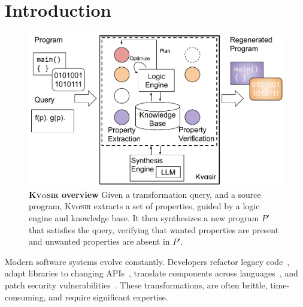 \documentclass[nonacm,sigplan]{acmart}
\newcommand{\sys}{{\scshape Kv{$\alpha$}sir}\xspace}
\begin{document}
\section{Introduction}
\begin{figure}[t]
  \includegraphics[width=.9\columnwidth]{figs/kvasir_overview.pdf}
  \caption{\textbf{\sys overview}
Given a transformation query, and a source program, \sys extracts a set
  of properties,
  guided by a logic engine and knowledge base.
  It then synthesizes a new program $P'$ that satisfies the query, verifying
  that wanted properties are present and unwanted properties are absent in $P'$.
}
  \label{fig:overview}
\end{figure}





Modern software systems evolve constantly.
Developers refactor legacy code~\cite{Fowler99,Mens04,facebook2010redesigns,dropbox2014syncengine},
adapt libraries to changing APIs~\cite{dig2005role,kula2017empiricalstudyimpactrefactoring},
translate components across languages~\cite{manzoor_cli_python,gaultier_rewrite_cpp},
and patch security vulnerabilities~\cite{ikegami2022userefactoringsecurityvulnerability,schneier2013security_vulnerabilities}.
These transformations, are often brittle, time-consuming, and require significant expertise.
\end{document}
